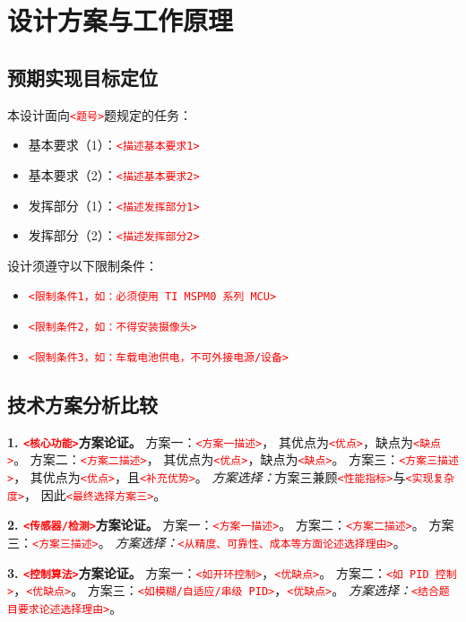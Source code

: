 \documentclass[12pt,a4paper,fontset=fandol]{ctexart}
\newcommand{\placeholder}[1]{\textcolor{red}{\texttt{<#1>}}}
\begin{document}
\section{设计方案与工作原理}

\subsection{预期实现目标定位}
本设计面向\placeholder{题号}题规定的任务：
\begin{itemize}
  \item 基本要求（1）：\placeholder{描述基本要求1}
  \item 基本要求（2）：\placeholder{描述基本要求2}
  \item 发挥部分（1）：\placeholder{描述发挥部分1}
  \item 发挥部分（2）：\placeholder{描述发挥部分2}
\end{itemize}
设计须遵守以下限制条件：
\begin{itemize}
  \item \placeholder{限制条件1，如：必须使用 TI MSPM0 系列 MCU}
  \item \placeholder{限制条件2，如：不得安装摄像头}
  \item \placeholder{限制条件3，如：车载电池供电，不可外接电源/设备}
\end{itemize}

\subsection{技术方案分析比较}

\textbf{1. \placeholder{核心功能}方案论证。}
方案一：\placeholder{方案一描述}，
其优点为\placeholder{优点}，缺点为\placeholder{缺点}。
方案二：\placeholder{方案二描述}，
其优点为\placeholder{优点}，缺点为\placeholder{缺点}。
方案三：\placeholder{方案三描述}，
其优点为\placeholder{优点}，且\placeholder{补充优势}。
\emph{方案选择：}方案三兼顾\placeholder{性能指标}与\placeholder{实现复杂度}，
因此\placeholder{最终选择方案三}。

\textbf{2. \placeholder{传感器/检测}方案论证。}
方案一：\placeholder{方案一描述}。
方案二：\placeholder{方案二描述}。
方案三：\placeholder{方案三描述}。
\emph{方案选择：}\placeholder{从精度、可靠性、成本等方面论述选择理由}。

\textbf{3. \placeholder{控制算法}方案论证。}
方案一：\placeholder{如开环控制}，\placeholder{优缺点}。
方案二：\placeholder{如 PID 控制}，\placeholder{优缺点}。
方案三：\placeholder{如模糊/自适应/串级 PID}，\placeholder{优缺点}。
\emph{方案选择：}\placeholder{结合题目要求论述选择理由}。
\end{document}
